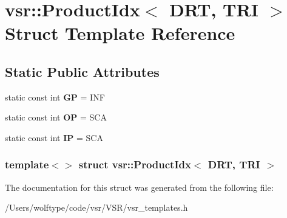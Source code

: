 \hypertarget{structvsr_1_1_product_idx_3_01_d_r_t_00_01_t_r_i_01_4}{\section{vsr\-:\-:Product\-Idx$<$ D\-R\-T, T\-R\-I $>$ Struct Template Reference}
\label{structvsr_1_1_product_idx_3_01_d_r_t_00_01_t_r_i_01_4}
}
\subsection*{Static Public Attributes}
\begin{DoxyCompactItemize}
\item 
\hypertarget{structvsr_1_1_product_idx_3_01_d_r_t_00_01_t_r_i_01_4_ac7003d571f769e5effcd3f13b0acd1ec}{static const int {\bfseries G\-P} = I\-N\-F}\label{structvsr_1_1_product_idx_3_01_d_r_t_00_01_t_r_i_01_4_ac7003d571f769e5effcd3f13b0acd1ec}

\item 
\hypertarget{structvsr_1_1_product_idx_3_01_d_r_t_00_01_t_r_i_01_4_ae534a035011b9d0603982833106c63bd}{static const int {\bfseries O\-P} = S\-C\-A}\label{structvsr_1_1_product_idx_3_01_d_r_t_00_01_t_r_i_01_4_ae534a035011b9d0603982833106c63bd}

\item 
\hypertarget{structvsr_1_1_product_idx_3_01_d_r_t_00_01_t_r_i_01_4_a577782f99ad4555227f8e43f577de09e}{static const int {\bfseries I\-P} = S\-C\-A}\label{structvsr_1_1_product_idx_3_01_d_r_t_00_01_t_r_i_01_4_a577782f99ad4555227f8e43f577de09e}

\end{DoxyCompactItemize}
\subsubsection*{template$<$$>$ struct vsr\-::\-Product\-Idx$<$ D\-R\-T, T\-R\-I $>$}



The documentation for this struct was generated from the following file\-:\begin{DoxyCompactItemize}
\item 
/\-Users/wolftype/code/vsr/\-V\-S\-R/vsr\-\_\-templates.\-h\end{DoxyCompactItemize}
